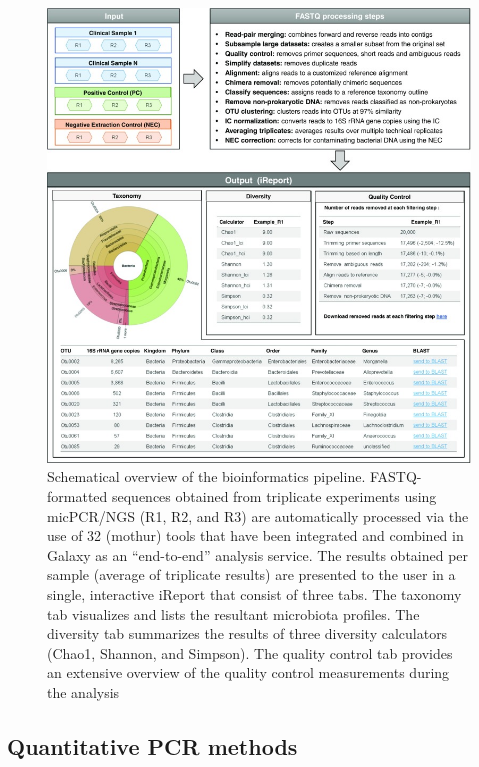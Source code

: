 \begin{figure}[t!]
\centering
\includegraphics[scale=0.5]{chapters/images/mycrobiota/mycrobiota-fig1.jpg}
\caption{Schematical overview of the bioinformatics pipeline. FASTQ-formatted sequences obtained from triplicate experiments using micPCR/NGS (R1, R2, and R3) are automatically processed via the use of 32 (mothur) tools that have been integrated and combined in Galaxy as an “end-to-end” analysis service. The results obtained per sample (average of triplicate results) are presented to the user in a single, interactive iReport that consist of three tabs. The taxonomy tab visualizes and lists the resultant microbiota profiles. The diversity tab summarizes the results of three diversity calculators (Chao1, Shannon, and Simpson). The quality control tab provides an extensive overview of the quality control measurements during the analysis}\label{fig:mycrobiota-pipeline}
\end{figure}


\subsection*{Quantitative PCR methods}

